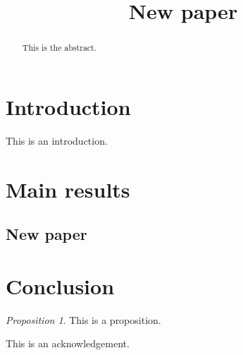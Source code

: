 \documentclass{imsart}
\theoremstyle{plain}
\theoremstyle{remark}
\newtheorem{prop}{Proposition}
\begin{document}
\pagestyle{plain}
\begin{frontmatter}
\title{New paper}






\begin{abstract}
This is the abstract.
\end{abstract}


\begin{keyword}
\end{keyword}

\end{frontmatter}



\section{Introduction}
This is an introduction.


\section{Main results}
\subsection{New paper}


\section*{Conclusion}
\begin{prop}
This is a proposition.
\end{prop}




\begin{acks}[Acknowledgments]
This is an acknowledgement.
\end{acks}






\end{document}
